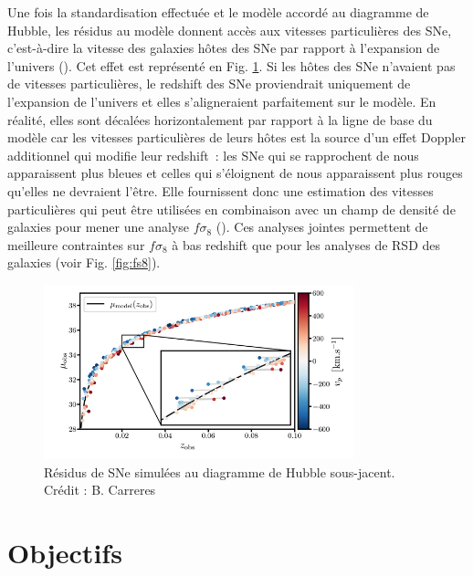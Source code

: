 \documentclass{book}
\begin{document}
Une fois la standardisation effectuée et le modèle accordé au diagramme de Hubble, les résidus au modèle donnent accès aux vitesses particulières des SNe, c’est-à-dire la vitesse des galaxies hôtes des SNe par rapport à l’expansion de l’univers (\cite{davis_effect_2011}). Cet effet est représenté en Fig. \ref{fig:residues}. Si les hôtes des SNe n’avaient pas de vitesses particulières, le redshift des SNe proviendrait uniquement de l’expansion de l’univers et elles s’aligneraient parfaitement sur le modèle. En réalité, elles sont décalées horizontalement par rapport à la ligne de base du modèle car les vitesses particulières de leurs hôtes est la source d’un effet Doppler additionnel qui modifie leur redshift~: les SNe qui se rapprochent de nous apparaissent plus bleues et celles qui s’éloignent de nous apparaissent plus rouges qu’elles ne devraient l’être. Elle fournissent donc une estimation des vitesses particulières qui peut être utilisées en combinaison avec un champ de densité de galaxies pour mener une analyse $f\sigma_8$ (\cite{boruah_bayesian_2022, stahl_peculiar-velocity_2021}). Ces analyses jointes permettent de meilleure contraintes sur $f\sigma_8$ à bas redshift que pour les analyses de RSD des galaxies (voir Fig. \ref{fig:fs8}).

\begin{figure}
    \centering
    \includegraphics[width=0.8\textwidth]{figures/Residues.png}
    \caption{Résidus de SNe simulées au diagramme de Hubble sous-jacent. Crédit : B. Carreres}
    \label{fig:residues}
\end{figure}

\section{Objectifs}
\end{document}
